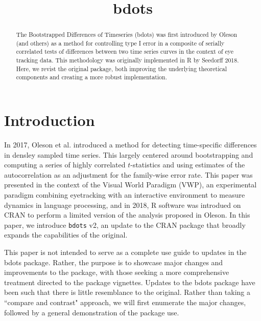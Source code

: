 \documentclass{article}
\title{bdots}
\date{}
\begin{document}

\maketitle

%

\begin{abstract}
The Bootstrapped Differences of Timeseries (bdots) was first introduced by Oleson (and others) as a method for controlling type I error in a composite of serially correlated tests of differences between two time series curves in the context of eye tracking data.  This methodology was originally implemented in R by Seedorff 2018. Here, we revist the original package, both improving the underlying theoretical components and creating a more robust implementation.
\end{abstract}

\section{Introduction}

In 2017, Oleson et al. introduced a method for detecting time-specific differences in densley sampled time series. This largely centered around bootstrapping and computing a series of highly correlated $t$-statistics and using estimates of the autocorrelation as an adjustment for the family-wise error rate. This paper was presented in the context of the Visual World Paradigm (VWP), an experimental paradigm combining eyetracking with an interactive environment to measure dynamics in language processing, and in 2018, R software was introdued on CRAN to perform a limited version of the analysis proposed in Oleson. In this paper, we introduce \texttt{bdots} v2, an update to the CRAN package that broadly expands the capabilities of the original. 

This paper is not intended to serve as a complete use guide to updates in the bdots package. Rather, the purpose is to showcase major changes and improvements to the package, with those seeking a more comprehensive treatment directed to the package vignettes. Updates to the bdots package have been such that there is little resemblance to the original. Rather than taking a ``compare and contrast" approach, we will first enumerate the major changes, followed by a general demonstration of the package use. 
\end{document}
